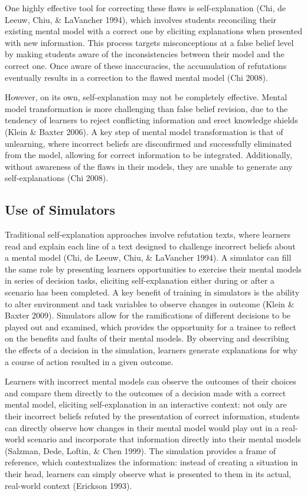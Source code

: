 \documentclass{book}
\begin{document}
One highly effective tool for correcting these flaws is self-explanation (Chi, de Leeuw, Chiu, & LaVancher 1994), which involves students reconciling their existing mental model with a correct one by eliciting explanations when presented with new information. This process targets misconceptions at a false belief level by making students aware of the inconsistencies between their model and the correct one. Once aware of these inaccuracies, the accumulation of refutations eventually results in a correction to the flawed mental model (Chi 2008).

However, on its own, self-explanation may not be completely effective. Mental model transformation is more challenging than false belief revision, due to the tendency of learners to reject conflicting information and erect knowledge shields (Klein & Baxter 2006). A key step of mental model transformation is that of unlearning, where incorrect beliefs are disconfirmed and successfully eliminated from the model, allowing for correct information to be integrated. Additionally, without awareness of the flaws in their models, they are unable to generate any self-explanations (Chi 2008).

\subsection{Use of Simulators}

Traditional self-explanation approaches involve refutation texts, where learners read and explain each line of a text designed to challenge incorrect beliefs about a mental model (Chi, de Leeuw, Chiu, & LaVancher 1994). A simulator can fill the same role by presenting learners opportunities to exercise their mental models in series of decision tasks, eliciting self-explanation either during or after a scenario has been completed. A key benefit of training in simulators is the ability to alter environment and task variables to observe changes in outcome (Klein & Baxter 2009). Simulators allow for the ramifications of different decisions to be played out and examined, which provides the opportunity for a trainee to reflect on the benefits and faults of their mental models. By observing and describing the effects of a decision in the simulation, learners generate explanations for why a course of action resulted in a given outcome.

Learners with incorrect mental models can observe the outcomes of their choices and compare them directly to the outcomes of a decision made with a correct mental model, eliciting self-explanation in an interactive context: not only are their incorrect beliefs refuted by the presentation of correct information, students can directly observe how changes in their mental model would play out in a real-world scenario and incorporate that information directly into their mental models (Salzman, Dede, Loftin, & Chen 1999). The simulation provides a frame of reference, which contextualizes the information: instead of creating a situation in their head, learners can simply observe what is presented to them in its actual, real-world context (Erickson 1993).
\end{document}
